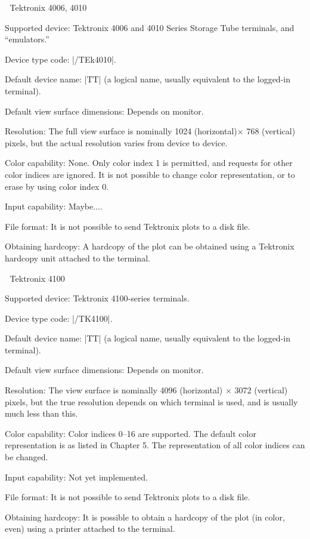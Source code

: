
\beginsection Tektronix 4006, 4010

\proclaim Supported device: Tektronix 4006 and 4010 Series Storage Tube 
terminals, and ``emulators.''

\proclaim Device type code: |/TEk4010|.

\proclaim Default device name: |TT| (a logical name, usually equivalent 
to the logged-in terminal).

\proclaim Default view surface dimensions: Depends on monitor.

\proclaim Resolution: The full view surface is nominally 1024 
(horizontal)$\times$ 768 (vertical) pixels, but the actual resolution
varies from device to device.

\proclaim Color capability: None.  Only color index 1 is permitted, and
requests for other color indices are ignored.
It is not possible to change color representation, or to erase by using 
color index 0.

\proclaim Input capability: Maybe....

\proclaim File format: It is not possible to send Tektronix plots to a 
disk file.

\proclaim Obtaining hardcopy: A hardcopy of the plot can be obtained 
using a Tektronix hardcopy unit attached to the terminal.


\beginsection Tektronix 4100 

\proclaim Supported device: Tektronix 4100-series terminals.

\proclaim Device type code: |/TK4100|.

\proclaim Default device name: |TT| (a logical name, usually equivalent 
to the logged-in terminal).

\proclaim Default view surface dimensions: Depends on monitor.

\proclaim Resolution: The view surface is nominally 4096 (horizontal)
$\times$ 3072 (vertical) pixels, but the true resolution depends on
which terminal is used, and is usually much less than this.

\proclaim Color capability: Color indices 0--16 are supported. The
default color representation is as listed in Chapter 5. The
representation of all color indices can be changed. 

\proclaim Input capability: Not yet implemented.

\proclaim File format: It is not possible to send Tektronix plots to a 
disk file.

\proclaim Obtaining hardcopy: It is possible to obtain a hardcopy of the 
plot (in color, even) using a printer attached to the terminal.

